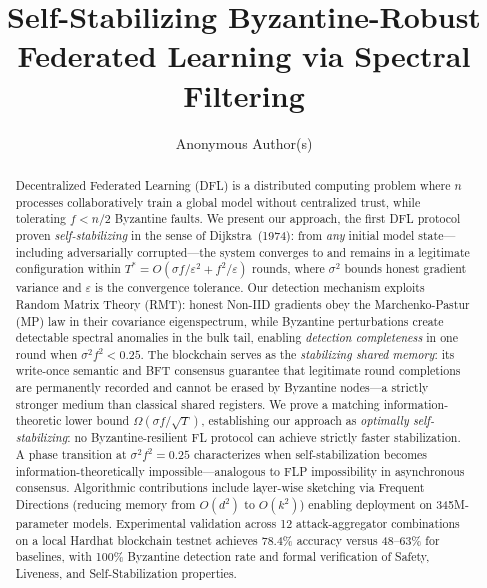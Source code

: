 \documentclass[runningheads]{llncs}
\begin{document}
\title{Self-Stabilizing Byzantine-Robust Federated Learning via Spectral Filtering}

\author{Anonymous Author(s)}

\maketitle

\begin{abstract}
Decentralized Federated Learning (DFL) is a distributed computing problem where $n$ processes collaboratively train a global model without centralized trust, while tolerating $f < n/2$ Byzantine faults. We present our approach, the first DFL protocol proven \emph{self-stabilizing} in the sense of Dijkstra~(1974): from \emph{any} initial model state---including adversarially corrupted---the system converges to and remains in a legitimate configuration within $T^* = O(\sigma f/\varepsilon^2 + f^2/\varepsilon)$ rounds, where $\sigma^2$ bounds honest gradient variance and $\varepsilon$ is the convergence tolerance. Our detection mechanism exploits Random Matrix Theory (RMT): honest Non-IID gradients obey the Marchenko-Pastur (MP) law in their covariance eigenspectrum, while Byzantine perturbations create detectable spectral anomalies in the bulk tail, enabling \emph{detection completeness} in one round when $\sigma^2 f^2 < 0.25$. The blockchain serves as the \emph{stabilizing shared memory}: its write-once semantic and BFT consensus guarantee that legitimate round completions are permanently recorded and cannot be erased by Byzantine nodes---a strictly stronger medium than classical shared registers. We prove a matching information-theoretic lower bound $\Omega(\sigma f/\sqrt{T})$, establishing our approach as \emph{optimally self-stabilizing}: no Byzantine-resilient FL protocol can achieve strictly faster stabilization. A phase transition at $\sigma^2 f^2 = 0.25$ characterizes when self-stabilization becomes information-theoretically impossible---analogous to FLP impossibility in asynchronous consensus. Algorithmic contributions include layer-wise sketching via Frequent Directions (reducing memory from $O(d^2)$ to $O(k^2)$) enabling deployment on 345M-parameter models. Experimental validation across 12 attack-aggregator combinations on a local Hardhat blockchain testnet achieves 78.4\% accuracy versus 48--63\% for baselines, with 100\% Byzantine detection rate and formal verification of Safety, Liveness, and Self-Stabilization properties.
\end{abstract}
\end{document}
